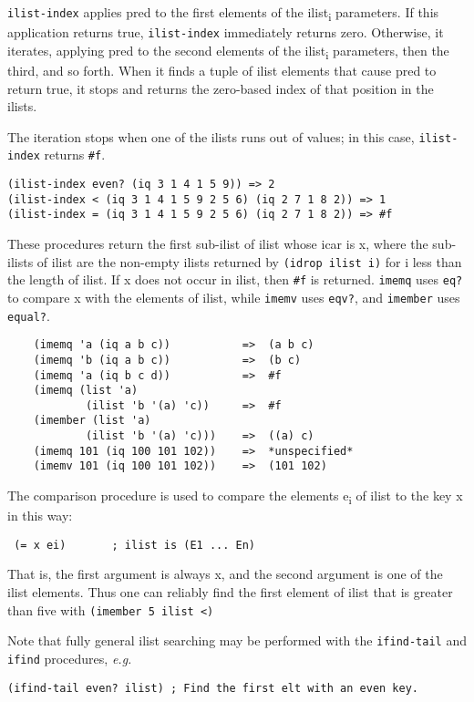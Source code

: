 \begin{description}
\texttt{ilist-index} applies pred to the first elements of the
ilist\textsubscript{i} parameters. If this application returns true,
\texttt{ilist-index} immediately returns zero. Otherwise, it iterates,
applying pred to the second elements of the ilist\textsubscript{i}
parameters, then the third, and so forth. When it finds a tuple of ilist
elements that cause pred to return true, it stops and returns the
zero-based index of that position in the ilists.

The iteration stops when one of the ilists runs out of values; in this
case, \texttt{ilist-index} returns \texttt{\#f}.

\begin{verbatim}
(ilist-index even? (iq 3 1 4 1 5 9)) => 2
(ilist-index < (iq 3 1 4 1 5 9 2 5 6) (iq 2 7 1 8 2)) => 1
(ilist-index = (iq 3 1 4 1 5 9 2 5 6) (iq 2 7 1 8 2)) => #f
\end{verbatim}
\item[ \href{}{} \texttt{imember} x ilist {[}={]} -\textgreater{}
ilist\\
\href{}{} \texttt{imemq} x ilist -\textgreater{} ilist\\
\href{}{} \texttt{imemv} x ilist -\textgreater{} ilist ]
These procedures return the first sub-ilist of ilist whose icar is x,
where the sub-ilists of ilist are the non-empty ilists returned by
\texttt{(idrop\ ilist\ i)} for i less than the length of ilist. If x
does not occur in ilist, then \texttt{\#f} is returned. \texttt{imemq}
uses \texttt{eq?} to compare x with the elements of ilist, while
\texttt{imemv} uses \texttt{eqv?}, and \texttt{imember} uses
\texttt{equal?}.

\begin{verbatim}
    (imemq 'a (iq a b c))           =>  (a b c)
    (imemq 'b (iq a b c))           =>  (b c)
    (imemq 'a (iq b c d))           =>  #f
    (imemq (list 'a)
            (ilist 'b '(a) 'c))     =>  #f
    (imember (list 'a)
            (ilist 'b '(a) 'c)))    =>  ((a) c)
    (imemq 101 (iq 100 101 102))    =>  *unspecified*
    (imemv 101 (iq 100 101 102))    =>  (101 102)
\end{verbatim}

The comparison procedure is used to compare the elements
e\textsubscript{i} of ilist to the key x in this way:

\texttt{\ (=\ x\ ei)\ \ \ \ \ \ \ ;\ ilist\ is\ (E1\ ...\ En)}

That is, the first argument is always x, and the second argument is one
of the ilist elements. Thus one can reliably find the first element of
ilist that is greater than five with
\texttt{(imember\ 5\ ilist\ \textless{})}

Note that fully general ilist searching may be performed with the
\texttt{ifind-tail} and \texttt{ifind} procedures, \emph{e.g.}

\begin{verbatim}
(ifind-tail even? ilist) ; Find the first elt with an even key.
\end{verbatim}
\end{description}

